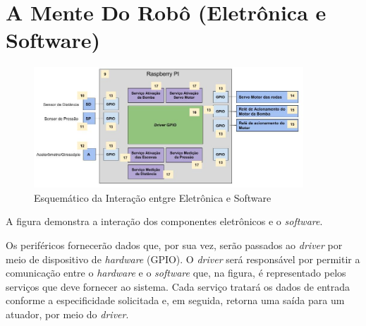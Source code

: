 \section{A Mente Do Robô (Eletrônica e Software)}
\par
\begin{figure}[h]
  \centering
  \includegraphics[width=0.9\textwidth]{figures/schema-interactive-eletro-soft.jpg}
  \caption{Esquemático da Interação entgre Eletrônica e Software}
  \label{fig:schema-interactive-electro-soft}
\end{figure}
\FloatBarrier
\par
A figura demonstra a interação dos componentes eletrônicos e o \textit{software}.
\par
Os periféricos fornecerão dados que, por sua vez, serão passados ao \textit{driver} por
meio de dispositivo de \textit{hardware} (GPIO).  O \textit{driver} será responsável por permitir
a comunicação entre o \textit{hardware} e o \textit{software} que, na figura, é representado pelos
serviços que deve fornecer ao sistema. Cada serviço tratará os dados de entrada
conforme a especificidade solicitada e, em seguida, retorna uma saída para um
atuador, por meio do \textit{driver}.
\par

